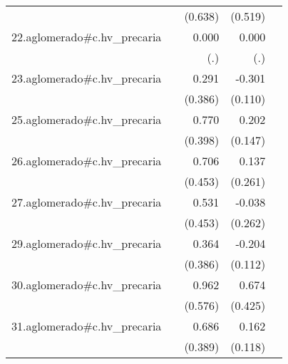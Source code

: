 {\begin{longtable}{l*{4}{D{.}{.}{-1}}}
            &                     &     (0.638)         &     (0.519)         &                     \\
\addlinespace
22.aglomerado#c.hv\_precaria&                     &       0.000         &       0.000         &                     \\
            &                     &         (.)         &         (.)         &                     \\
\addlinespace
23.aglomerado#c.hv\_precaria&                     &       0.291         &      -0.301\sym{**} &                     \\
            &                     &     (0.386)         &     (0.110)         &                     \\
\addlinespace
25.aglomerado#c.hv\_precaria&                     &       0.770         &       0.202         &                     \\
            &                     &     (0.398)         &     (0.147)         &                     \\
\addlinespace
26.aglomerado#c.hv\_precaria&                     &       0.706         &       0.137         &                     \\
            &                     &     (0.453)         &     (0.261)         &                     \\
\addlinespace
27.aglomerado#c.hv\_precaria&                     &       0.531         &      -0.038         &                     \\
            &                     &     (0.453)         &     (0.262)         &                     \\
\addlinespace
29.aglomerado#c.hv\_precaria&                     &       0.364         &      -0.204         &                     \\
            &                     &     (0.386)         &     (0.112)         &                     \\
\addlinespace
30.aglomerado#c.hv\_precaria&                     &       0.962         &       0.674         &                     \\
            &                     &     (0.576)         &     (0.425)         &                     \\
\addlinespace
31.aglomerado#c.hv\_precaria&                     &       0.686         &       0.162         &                     \\
            &                     &     (0.389)         &     (0.118)         &                     \\

\end{longtable}}
